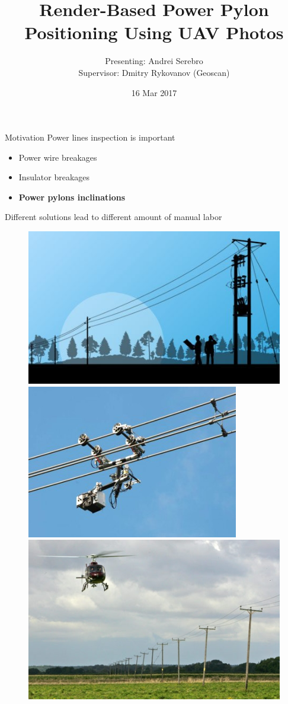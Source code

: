 \documentclass{beamer}
\author{Presenting: Andrei Serebro\\
Supervisor: Dmitry Rykovanov (Geoscan)}
\title{Render-Based Power Pylon Positioning Using UAV Photos}
\institute{St Petersburg Academic University}
\date[b]{16 Mar 2017}
\begin{document}
\begin{frame}[t,plain]
\titlepage
\end{frame}

\begin{frame}[t, fragile]{Motivation}
Power lines inspection is important
\begin{itemize}
\item Power wire breakages
\item Insulator  breakages
\item \textbf{Power pylons inclinations}
\end{itemize}

Different solutions lead to different amount of manual labor\\
\begin{figure}
\includegraphics[scale=0.23]{inspection_people}
  \hspace{0.1cm}
\includegraphics[scale=0.26]{inspection_robot}
  \hspace{0.1cm}
\includegraphics[scale=0.22]{inspection_helicopter}
\end{figure}
\end{frame}
\end{document}
